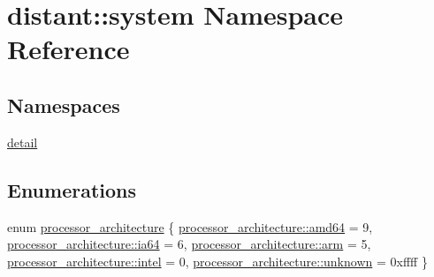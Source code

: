 \hypertarget{namespacedistant_1_1system}{}\section{distant\+:\+:system Namespace Reference}
\label{namespacedistant_1_1system}
\subsection*{Namespaces}
\begin{DoxyCompactItemize}
\item 
 \mbox{\hyperlink{namespacedistant_1_1system_1_1detail}{detail}}
\end{DoxyCompactItemize}
\subsection*{Enumerations}
\begin{DoxyCompactItemize}
\item 
enum \mbox{\hyperlink{namespacedistant_1_1system_aabfc7b1c055c49cfbb199db3374aaddd}{processor\+\_\+architecture}} \{ \newline
\mbox{\hyperlink{namespacedistant_1_1system_aabfc7b1c055c49cfbb199db3374aadddac71a96e493463b7d7437da5e490f56af}{processor\+\_\+architecture\+::amd64}} = 9, 
\mbox{\hyperlink{namespacedistant_1_1system_aabfc7b1c055c49cfbb199db3374aaddda53c28cc68db9108085f6e5840442c2bc}{processor\+\_\+architecture\+::ia64}} = 6, 
\mbox{\hyperlink{namespacedistant_1_1system_aabfc7b1c055c49cfbb199db3374aadddaf926b3e222d7afee57071b2256839701}{processor\+\_\+architecture\+::arm}} = 5, 
\mbox{\hyperlink{namespacedistant_1_1system_aabfc7b1c055c49cfbb199db3374aaddda4e5bbaeafc82ab7aa1385bea8ef5d30a}{processor\+\_\+architecture\+::intel}} = 0, 
\newline
\mbox{\hyperlink{namespacedistant_1_1system_aabfc7b1c055c49cfbb199db3374aadddaad921d60486366258809553a3db49a4a}{processor\+\_\+architecture\+::unknown}} = 0xffff
 \}
\end{DoxyCompactItemize}
